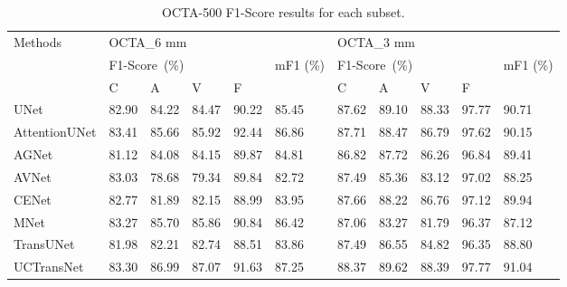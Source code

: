 \documentclass[times, review, 10pt]{elsarticle}
\begin{document}
\begin{CJK}{UTF8}{gbsn}
\begin{table}[htb]
\centering
\caption{OCTA-500 F1-Score results for each subset.}
\label{tab3}
\renewcommand{\arraystretch}{1} %
\setlength{\tabcolsep}{3.2pt}
\small
\begin{tabular}{lllllllllll} 
\toprule
\multirow{3}{*}{Methods} & \multicolumn{5}{l}{OCTA\_6 mm}                                & \multicolumn{5}{l}{OCTA\_3 mm}                                 \\ 
\cline{2-5}\cline{7-10}
                         & \multicolumn{4}{l}{F1-Score~(\%)} & \multirow{2}{*}{mF1 (\%)} & \multicolumn{4}{l}{F1-Score~(\%)} & \multirow{2}{*}{mF1 (\%)}  \\ 
\cline{2-5}\cline{7-10}
                         & C     & A     & V     & F         &                           & C     & A     & V     & F         &                            \\ 
\hline
UNet          & 82.90          & 84.22          & 84.47          & 90.22          & 85.45          & 87.62          & 89.10          & 88.33          & 97.77          & 90.71\textbf{} \\
AttentionUNet & 83.41          & 85.66          & 85.92          & 92.44          & 86.86          & 87.71          & 88.47          & 86.79          & 97.62          & 90.15\textbf{} \\
AGNet         & 81.12          & 84.08          & 84.15          & 89.87          & 84.81          & 86.82          & 87.72          & 86.26          & 96.84          & 89.41\textbf{} \\
AVNet         & 83.03          & 78.68          & 79.34          & 89.84          & 82.72          & 87.49          & 85.36          & 83.12          & 97.02          & 88.25\textbf{} \\
CENet         & 82.77          & 81.89          & 82.15          & 88.99          & 83.95          & 87.66          & 88.22          & 86.76          & 97.12          & 89.94\textbf{} \\
MNet          & 83.27          & 85.70          & 85.86          & 90.84          & 86.42          & 87.06          & 83.27          & 81.79          & 96.37          & 87.12\textbf{} \\
TransUNet     & 81.98          & 82.21          & 82.74          & 88.51          & 83.86          & 87.49          & 86.55          & 84.82          & 96.35          & 88.80\textbf{} \\
UCTransNet    & 83.30          & 86.99          & 87.07          & 91.63          & 87.25          & 88.37          & 89.62          & 88.39          & 97.77          & 91.04\textbf{} \\

\end{tabular}
\end{table}
\end{CJK}
\end{document}
